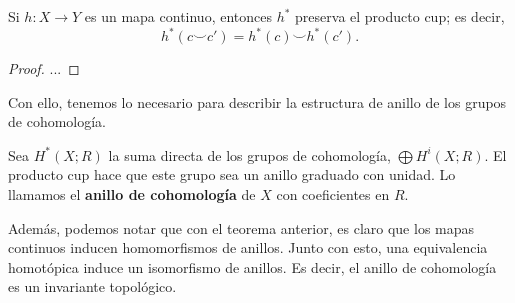 \begin{theorem}
	Si $h \colon X \to Y$ es un mapa continuo, entonces $h^{*}$ preserva el producto cup; es decir,
	\[ h^{*}(c \smile c') = h^{*}(c) \smile h^{*}(c'). \]
\end{theorem}
\begin{proof}
	...
\end{proof}

Con ello, tenemos lo necesario para describir la estructura de anillo de los grupos de cohomología.

\begin{definition}
	Sea $H^{*}(X;R)$ la suma directa de los grupos de cohomología, $\bigoplus H^{i}(X;R)$. El producto cup hace que este grupo sea un anillo graduado con unidad. Lo llamamos el \textbf{anillo de cohomología} de $X$ con coeficientes en $R$.
\end{definition}

Además, podemos notar que con el teorema anterior, es claro que los mapas continuos inducen homomorfismos de anillos. Junto con esto, una equivalencia homotópica induce un isomorfismo de anillos. Es decir, el anillo de cohomología es un invariante topológico.
